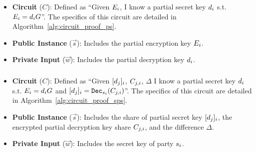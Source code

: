 \documentclass[lettersize,journal]{IEEEtran}
\theoremstyle{definition}
\begin{document}
\subsubsection{}\label{app:proof-ps}

\begin{itemize}
    \item \textbf{Circuit} ($C$): Defined as ``Given $E_{i}$, I know a partial secret key $d_{i}$ s.t. $E_{i} = d_{i} G$''. The specifics of this circuit are detailed in Algorithm~\ref{alg:circuit_proof_ps}.
    \item \textbf{Public Instance} ($\vec{s}$): Includes the partial encryption key $E_{i}$.
    \item \textbf{Private Input} ($\vec{w}$): Includes the partial decryption key $d_{i}$.
\end{itemize}

\subsubsection{}\label{app:proof-sps}

\begin{itemize}
    \item \textbf{Circuit} ($C$): Defined as ``Given $[d_{j}]_{i}$, $C_{j,i}$, $\Delta$ I know a partial secret key $d_{i}$ s.t. $E_{i} = d_{i} G$ and  $[d_{j}]_{i} = \texttt{Dec}_{s_{i}}(C_{j,i})$''. The specifics of this circuit are detailed in Algorithm~\ref{alg:circuit_proof_sps}.
    
    \item \textbf{Public Instance} ($\vec{s}$): Includes the share of partial secret key $[d_{j}]_{i}$, the encrypted partial decryption key share $C_{j,i}$, and the difference $\Delta$.
    
    \item \textbf{Private Input} ($\vec{w}$): Includes the secret key of party $s_{i}$.
\end{itemize}
\end{document}
